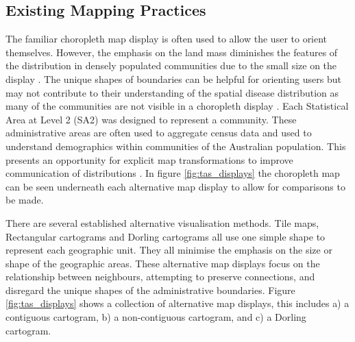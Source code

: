 \hypertarget{existing-mapping-practices}{%
\subsection{Existing Mapping
Practices}\label{existing-mapping-practices}}

The familiar choropleth map display is often used to allow the user to
orient themselves. However, the emphasis on the land mass diminishes the
features of the distribution in densely populated communities due to the
small size on the display \citep{ACTUC}. The unique shapes of boundaries
can be helpful for orienting users but may not contribute to their
understanding of the spatial disease distribution as many of the
communities are not visible in a choropleth display \citep{TVSSS}. Each
Statistical Area at Level 2 (SA2) \citep{abs2011} was designed to
represent a community. These administrative areas are often used to
aggregate census data and used to understand demographics within
communities of the Australian population. This presents an opportunity
for explicit map transformations to improve communication of
distributions \citep{CBATCC}. In figure \ref{fig:tas_displays} the
choropleth map can be seen underneath each alternative map display to
allow for comparisons to be made.

There are several established alternative visualisation methods. Tile
maps, Rectangular cartograms \citep{ORC} and Dorling cartograms
\citep{ACTUC} all use one simple shape to represent each geographic
unit. They all minimise the emphasis on the size or shape of the
geographic areas. These alternative map displays focus on the
relationship between neighbours, attempting to preserve connections, and
disregard the unique shapes of the administrative boundaries. Figure
\ref{fig:tas_displays} shows a collection of alternative map displays,
this includes a) a contiguous cartogram, b) a non-contiguous cartogram,
and c) a Dorling cartogram.

